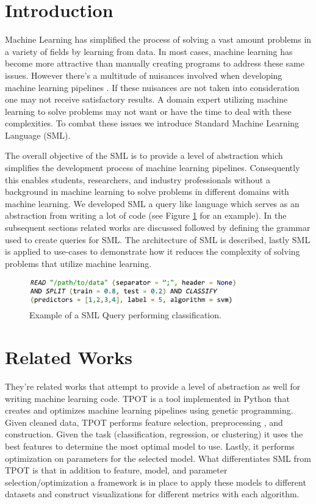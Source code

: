 \documentclass[jair,twoside,11pt,theapa]{article}
\begin{document}
\section{Introduction}
\label{Introduction}

Machine Learning has simplified the process of solving a vast amount problems in a variety of fields by learning from data. In most cases, machine learning has become more attractive than manually creating programs to address these same issues. However there's a multitude of nuisances involved when developing machine learning pipelines \cite{pedros:fewUsefulThings}. If these nuisances are not taken into consideration one may not receive satisfactory results. A domain expert utilizing machine learning to solve problems may not want or have the time to deal with these complexities. To combat these issues we introduce Standard Machine Learning Language (SML).

The overall objective of the SML is to provide a level of abstraction which simplifies the development process of machine learning pipelines. Consequently this enables students, researchers, and industry professionals without a background in machine learning to solve problems in different domains with machine learning. We developed SML a query like language which serves as an abstraction from writing a lot of code (see Figure \ref{fig:sml-ex-1} for an example). In the subsequent sections related works are discussed followed by defining the grammar used to create queries for SML. The architecture of SML is described, lastly SML is applied to use-cases to demonstrate how it reduces the complexity of solving problems that utilize machine learning.

\begin{figure}
\includegraphics[width=0.8\textwidth]{figs/sml-ex-1.png}
\centering
\caption{Example of a SML Query performing classification.}
\label{fig:sml-ex-1}
\end{figure}

\section{Related Works}
\label{RelatedWorks}

They're related works that attempt to provide a level of abstraction as well for writing machine learning code. TPOT \cite{TPOT} is a tool implemented in Python that creates and optimizes machine learning pipelines using genetic programming. Given cleaned data, TPOT performs feature selection, preprocessing , and construction. Given the task (classification, regression, or clustering) it uses the best features to determine the most optimal model to use. Lastly, it performs optimization on parameters for the selected model. What differentiates SML from TPOT is that in addition to feature, model, and parameter selection/optimization a framework is in place to apply these models to different datasets and construct visualizations for different metrics with each algorithm.
\end{document}
